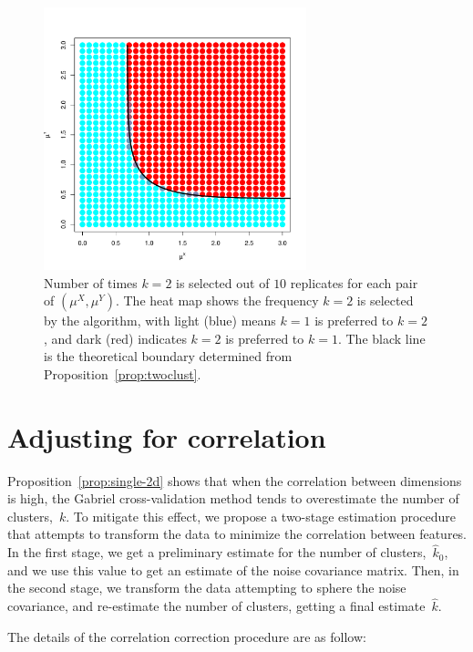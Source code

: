 \documentclass[12pt]{article}
\newcommand{\muX}{\mu^{X}}
\newcommand{\muY}{\mu^{Y}}
\begin{document}
\begin{figure}
\centering
\includegraphics[width=3in]{main_code/demo/overlap/color_plot.pdf}
\caption{Number of times $k=2$ is selected out of $10$ replicates for each
pair of $(\muX, \muY)$. The heat map shows the frequency $k=2$ is selected by
the algorithm, with light (blue) means $k = 1$ is preferred to $k = 2$, and
dark (red) indicates $k = 2$ is preferred to $k = 1$.
The black line is the theoretical boundary determined from
Proposition~\ref{prop:twoclust}.}
\label{fig:overlap-color_plot}
\end{figure}


\section{Adjusting for correlation}
\label{sec:corr-correct}


Proposition~\ref{prop:single-2d} shows that when the correlation between
dimensions is high, the Gabriel cross-validation method tends to overestimate
the number of clusters,~$k$. To mitigate this effect, we propose a two-stage
estimation procedure that attempts to transform the data to minimize the
correlation between features. In the first stage, we get a preliminary
estimate for the number of clusters,~$\hat k_0$, and we use this value to get
an estimate of the noise covariance matrix. Then, in the second stage, we
transform the data attempting to sphere the noise covariance, and re-estimate
the number of clusters, getting a final estimate~$\hat k$.

The details of the correlation correction procedure are as follow:
\end{document}
